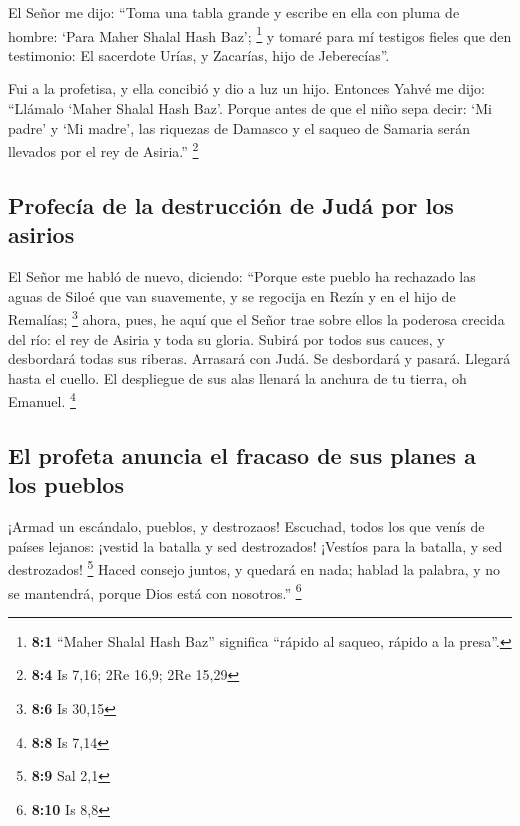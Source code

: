 \begin{paracol}{2}
 El Señor me dijo: ``Toma una tabla grande y escribe en
ella con pluma de hombre: `Para Maher Shalal Hash Baz'; \footnote{\textbf{8:1}
  ``Maher Shalal Hash Baz'' significa ``rápido al saqueo, rápido a la
  presa''.}  y tomaré para mí testigos fieles que den
testimonio: El sacerdote Urías, y Zacarías, hijo de Jeberecías''.

 Fui a la profetisa, y ella concibió y dio a luz un hijo.
Entonces Yahvé me dijo: ``Llámalo `Maher Shalal Hash Baz'.
 Porque antes de que el niño sepa decir: `Mi padre' y `Mi
madre', las riquezas de Damasco y el saqueo de Samaria serán llevados
por el rey de Asiria.'' \footnote{\textbf{8:4} Is 7,16; 2Re 16,9; 2Re
  15,29}

\hypertarget{profecuxeda-de-la-destrucciuxf3n-de-juduxe1-por-los-asirios}{%
\subsection{Profecía de la destrucción de Judá por los
asirios}\label{profecuxeda-de-la-destrucciuxf3n-de-juduxe1-por-los-asirios}}

 El Señor me habló de nuevo, diciendo: 
``Porque este pueblo ha rechazado las aguas de Siloé que van suavemente,
y se regocija en Rezín y en el hijo de Remalías; \footnote{\textbf{8:6}
  Is 30,15}  ahora, pues, he aquí que el Señor trae sobre
ellos la poderosa crecida del río: el rey de Asiria y toda su gloria.
Subirá por todos sus cauces, y desbordará todas sus riberas.
 Arrasará con Judá. Se desbordará y pasará. Llegará hasta
el cuello. El despliegue de sus alas llenará la anchura de tu tierra, oh
Emanuel. \footnote{\textbf{8:8} Is 7,14}

\hypertarget{el-profeta-anuncia-el-fracaso-de-sus-planes-a-los-pueblos}{%
\subsection{El profeta anuncia el fracaso de sus planes a los
pueblos}\label{el-profeta-anuncia-el-fracaso-de-sus-planes-a-los-pueblos}}

 ¡Armad un escándalo, pueblos, y destrozaos! Escuchad,
todos los que venís de países lejanos: ¡vestid la batalla y sed
destrozados! ¡Vestíos para la batalla, y sed destrozados! \footnote{\textbf{8:9}
  Sal 2,1}  Haced consejo juntos, y quedará en nada;
hablad la palabra, y no se mantendrá, porque Dios está con nosotros.''
\footnote{\textbf{8:10} Is 8,8}


\end{paracol}

